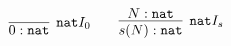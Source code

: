 \documentclass[crop]{standalone} %
\begin{document}
$\displaystyle
\infer[\texttt{nat} I_0]{
 0 : \texttt{nat}
}{}
\qquad
\infer[\texttt{nat} I_s]{
 s(N) : \texttt{nat}
}{
 N : \texttt{nat}
}
$
\end{document}
